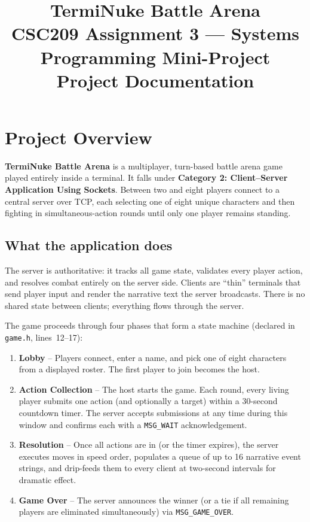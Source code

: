 \documentclass[11pt,letterpaper]{article}
\title{\textbf{TermiNuke Battle Arena}\\[4pt]
       \large CSC209 Assignment 3 --- Systems Programming Mini-Project\\[2pt]
       \normalsize Project Documentation}
\date{}
\begin{document}
\maketitle
\thispagestyle{empty}
\tableofcontents
\newpage

\section{Project Overview}

\textbf{TermiNuke Battle Arena} is a multiplayer, turn-based battle arena game played entirely inside a terminal. It falls under \textbf{Category 2: Client--Server Application Using Sockets}. Between two and eight players connect to a central server over TCP, each selecting one of eight unique characters and then fighting in simultaneous-action rounds until only one player remains standing.

\subsection*{What the application does}

The server is authoritative: it tracks all game state, validates every player action, and resolves combat entirely on the server side. Clients are ``thin'' terminals that send player input and render the narrative text the server broadcasts. There is no shared state between clients; everything flows through the server.

The game proceeds through four phases that form a state machine (declared in \texttt{game.h}, lines~12--17):

\begin{enumerate}[leftmargin=2em]
    \item \textbf{Lobby} -- Players connect, enter a name, and pick one of eight characters from a displayed roster. The first player to join becomes the host.
    \item \textbf{Action Collection} -- The host starts the game. Each round, every living player submits one action (and optionally a target) within a 30-second countdown timer. The server accepts submissions at any time during this window and confirms each with a \texttt{MSG\_WAIT} acknowledgement.
    \item \textbf{Resolution} -- Once all actions are in (or the timer expires), the server executes moves in speed order, populates a queue of up to 16 narrative event strings, and drip-feeds them to every client at two-second intervals for dramatic effect.
    \item \textbf{Game Over} -- The server announces the winner (or a tie if all remaining players are eliminated simultaneously) via \texttt{MSG\_GAME\_OVER}.
\end{enumerate}
\end{document}
